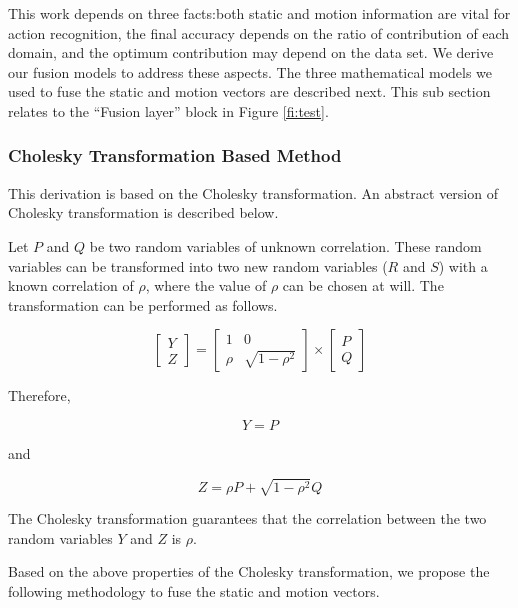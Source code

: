 
This work depends on three facts:both static and motion information
are vital for action recognition, the final accuracy depends on the ratio of contribution of each domain,
and the optimum contribution may depend on the data set. We derive our fusion models to address these aspects.
The three mathematical models we used
to fuse the static and motion vectors are described next. This sub section relates to the ``Fusion layer'' block in Figure \ref{fi:test}.

\subsubsection{Cholesky Transformation Based Method}

This derivation is based on the Cholesky transformation. An
abstract version of Cholesky transformation is described below.

Let $P$ and $Q$ be two random variables of unknown correlation. These random variables can be
transformed into two new random variables ($R$ and $S$) with a known correlation of $\rho$, where the
value of $\rho$ can be chosen at will. The transformation can be performed as follows.

\begin{equation}
\begin{bmatrix}
    Y     \\
    Z
\end{bmatrix}
=
\begin{bmatrix}
    1  & 0 \\
    \rho  & \sqrt{1-\rho^2}
\end{bmatrix}
\times
\begin{bmatrix}
    P     \\
    Q
\end{bmatrix}
\end{equation}

Therefore,

\begin{equation}
Y = P
\end{equation}

and

\begin{equation}
Z = \rho P + \sqrt{1-\rho^2}Q
\end{equation}

The Cholesky transformation guarantees that the correlation between the two random variables
$Y$ and $Z$ is $\rho$.

Based on the above properties of the Cholesky transformation, we propose the following methodology to fuse the static and
motion vectors.

